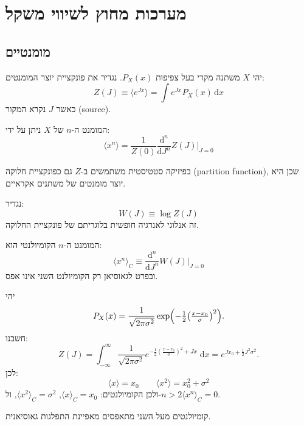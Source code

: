 \documentclass{tstextbook}
\begin{document}
\chapter{מערכות מחוץ לשיווי משקל}

\section{מומנטיים}

\begin{definition}
יהי \(X\) משתנה מקרי בעל צפיפות \(P_X(x)\). נגדיר את פונקציית יוצר המומנטים:
$$Z(J) \equiv \langle e^{J x}\rangle = \int e^{J x} P_X(x)\,\mathrm{d}x$$
כאשר \(J\) נקרא המקור (source).

\end{definition}
\begin{proposition}
המומנט ה-\(n\) של \(X\) ניתן על ידי:
$$\langle x^n \rangle = \frac{1}{Z(0)} \frac{\mathrm{d}^n}{\mathrm{d}J^n} Z(J) \Big|_{J=0}$$

\end{proposition}
\begin{remark}
בפיזיקה סטטיסטית משתמשים ב-\(Z\) גם כפונקציית חלוקה (partition function), שכן היא יוצר מומנטים של משתנים אקראיים.

\end{remark}
\begin{definition}[קומיולנט]
נגדיר:
$$W(J) \equiv \log Z(J)
$$
זה אנלוגי לאנרגיה חופשית בלוגריתם של פונקציית החלוקה.

\end{definition}
\begin{proposition}
המומנט ה-\(n\) הקומיולנטי הוא:
$$\langle x^n \rangle_C \equiv \frac{\mathrm{d}^n}{\mathrm{d}J^n} W(J)\Big|_{J=0}
$$
ובפרט לגאוסיאן רק הקומיולנט השני אינו אפס.

\end{proposition}
\begin{example}
יהי
$$P_X(x) = \frac{1}{\sqrt{2\pi\sigma^2}} \exp\Bigl(-\tfrac{1}{2}\bigl(\tfrac{x-x_0}{\sigma}\bigr)^2\Bigr).
$$
חשבנו:
$$Z(J) = \int_{-\infty}^{\infty} \frac{1}{\sqrt{2\pi\sigma^2}} e^{ - \tfrac{1}{2}(\frac{x-x_0}{\sigma})^2 + Jx }\;\mathrm{d}x= e^{ J x_0 + \tfrac{1}{2}J^2\sigma^2 }.
$$
לכן:
$$\langle x\rangle = x_0\qquad\langle x^2\rangle = x_0^2 + \sigma^2$$
ולכן הקומיולנטים: \(\langle x\rangle_C = x_0\), \(\langle x^2\rangle_C = \sigma^2\), ול-\(n>2\)\(\langle x^n\rangle_C=0\).

\end{example}
\begin{remark}
קומיולנטים מעל השני מתאפסים מאפיינת התפלגות גאוסיאנית.

\end{remark}
\end{document}

